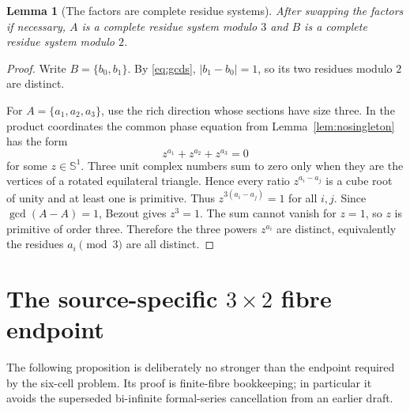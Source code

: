 \documentclass[11pt]{article}
\newtheorem{lemma}[theorem]{Lemma}
\begin{document}
\begin{lemma}[The factors are complete residue systems]\label{lem:crs}
After swapping the factors if necessary, $A$ is a complete residue system modulo $3$ and $B$ is a complete residue system modulo $2$.
\end{lemma}
\begin{proof}
Write $B=\{b_0,b_1\}$. By \eqref{eq:gcds}, $|b_1-b_0|=1$, so its two residues modulo $2$ are distinct.

For $A=\{a_1,a_2,a_3\}$, use the rich direction whose sections have size three. In the product coordinates the common phase equation from Lemma~\ref{lem:nosingleton} has the form
\[
 z^{a_1}+z^{a_2}+z^{a_3}=0
\]
for some $z\in\mathbb S^1$. Three unit complex numbers sum to zero only when they are the vertices of a rotated equilateral triangle. Hence every ratio $z^{a_i-a_j}$ is a cube root of unity and at least one is primitive. Thus $z^{3(a_i-a_j)}=1$ for all $i,j$. Since $\gcd(A-A)=1$, Bezout gives $z^3=1$. The sum cannot vanish for $z=1$, so $z$ is primitive of order three. Therefore the three powers $z^{a_i}$ are distinct, equivalently the residues $a_i\pmod3$ are all distinct.
\end{proof}

\section{The source-specific $3\times2$ fibre endpoint}
The following proposition is deliberately no stronger than the endpoint required by the six-cell problem. Its proof is finite-fibre bookkeeping; in particular it avoids the superseded bi-infinite formal-series cancellation from an earlier draft.
\end{document}
